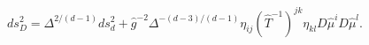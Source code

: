 \begin{equation}
ds_D^2=\Delta^{2/(d-1)}ds_d^2+\hat g^{-2}\Delta^{-(d-3)/(d-1)}
\eta_{ij}(\hat T^{-1})^{jk}\eta_{kl} D\hat\mu^iD\hat\mu^l.
\label{eq:hatmetans}
\end{equation}

